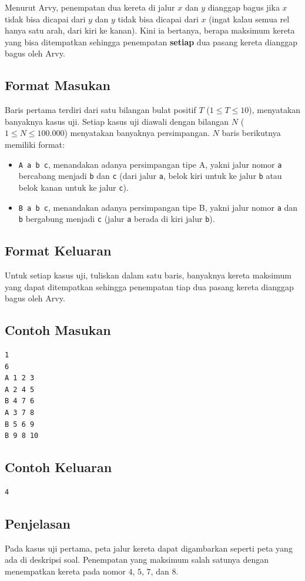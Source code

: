 \documentclass{article}
\begin{document}
Menurut Arvy, penempatan dua kereta di jalur $x$ dan $y$ dianggap bagus jika $x$ tidak bisa dicapai dari $y$ dan $y$ tidak bisa dicapai dari $x$ (ingat kalau semua rel hanya satu arah, dari kiri ke kanan).
Kini ia bertanya, berapa maksimum kereta yang bisa ditempatkan sehingga penempatan \textbf{setiap} dua pasang kereta dianggap bagus oleh Arvy.

\subsection*{Format Masukan}
Baris pertama terdiri dari satu bilangan bulat positif $T$ ($1 \leq T \leq 10$), menyatakan banyaknya kasus uji.
Setiap kasus uji diawali dengan bilangan $N$ ($1 \leq N \leq 100.000$) menyatakan banyaknya persimpangan.
$N$ baris berikutnya memiliki format:
\begin{itemize}
    \setlength{\itemsep}{0pt}
    \item \lstinline{A a b c}, menandakan adanya persimpangan tipe A, yakni jalur nomor \lstinline{a} bercabang menjadi \lstinline{b} dan \lstinline{c} (dari jalur \lstinline{a}, belok kiri untuk ke jalur \lstinline{b} atau belok kanan untuk ke jalur \lstinline{c}).
    \item \lstinline{B a b c}, menandakan adanya persimpangan tipe B, yakni jalur nomor \lstinline{a} dan \lstinline{b} bergabung menjadi \lstinline{c} (jalur \lstinline{a} berada di kiri jalur \lstinline{b}).
\end{itemize}

\subsection*{Format Keluaran}
Untuk setiap kasus uji, tuliskan dalam satu baris, banyaknya kereta maksimum yang dapat ditempatkan sehingga penempatan tiap dua pasang kereta dianggap bagus oleh Arvy.

\pagebreak

\begin{multicols}{2}
\subsection*{Contoh Masukan}
\begin{lstlisting}
1
6
A 1 2 3
A 2 4 5
B 4 7 6
A 3 7 8
B 5 6 9
B 9 8 10
\end{lstlisting}
\columnbreak
\subsection*{Contoh Keluaran}
\begin{lstlisting}
4
\end{lstlisting}
\vfill
\null
\end{multicols}

\subsection*{Penjelasan}
Pada kasus uji pertama, peta jalur kereta dapat digambarkan seperti peta yang ada di deskripsi soal. Penempatan yang maksimum salah satunya dengan menempatkan kereta pada nomor $4$, $5$, $7$, dan $8$.
\end{document}
